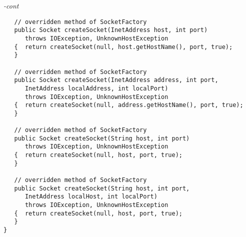 \begin{figure*}\begin{program}\emph{-cont}\begin{verbatim}
   // overridden method of SocketFactory
   public Socket createSocket(InetAddress host, int port)
      throws IOException, UnknownHostException
   {  return createSocket(null, host.getHostName(), port, true);
   }

   // overridden method of SocketFactory
   public Socket createSocket(InetAddress address, int port,
      InetAddress localAddress, int localPort)
      throws IOException, UnknownHostException
   {  return createSocket(null, address.getHostName(), port, true);
   }

   // overridden method of SocketFactory
   public Socket createSocket(String host, int port)
      throws IOException, UnknownHostException
   {  return createSocket(null, host, port, true);
   }

   // overridden method of SocketFactory
   public Socket createSocket(String host, int port,
      InetAddress localHost, int localPort)
      throws IOException, UnknownHostException
   {  return createSocket(null, host, port, true);
   }
}
\end{verbatim}\end{program}\end{figure*}

